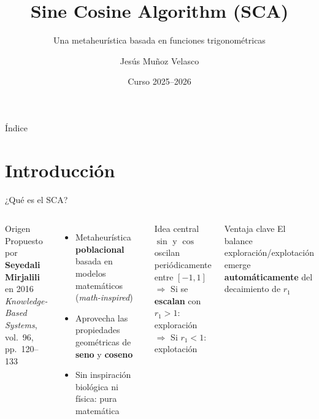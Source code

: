 \documentclass[aspectratio=169]{beamer}
\title[SCA]{Sine Cosine Algorithm (SCA)}
\subtitle{Una metaheurística basada en funciones trigonométricas}
\author{Jesús Muñoz Velasco}
\institute{Metaheurísticas · Trabajo Final}
\date{Curso 2025--2026}
\newcommand{\highlight}[1]{\textcolor{myblue}{\textbf{#1}}}
\begin{document}
\begin{frame}[plain]
  \titlepage
\end{frame}

\begin{frame}{Índice}
  \tableofcontents
\end{frame}

\section{Introducción}

\begin{frame}{¿Qué es el SCA?}
  \begin{columns}[T]
      \begin{block}{Origen}
        Propuesto por \textbf{Seyedali Mirjalili} en 2016\\
        \textit{Knowledge-Based Systems}, vol.~96, pp.~120--133
      \end{block}
      \vspace{0.4em}
      \begin{itemize}
        \item Metaheurística \highlight{poblacional} basada en modelos matemáticos (\textit{math-inspired})
        \item Aprovecha las propiedades geométricas de \highlight{seno} y \highlight{coseno}
        \item Sin inspiración biológica ni física: pura matemática
      \end{itemize}

      \begin{exampleblock}{Idea central}
        $\sin$ y $\cos$ oscilan periódicamente entre $[-1,1]$\\[0.4em]
        $\Rightarrow$ Si se \textbf{escalan} con $r_1 > 1$: exploración\\
        $\Rightarrow$ Si $r_1 < 1$: explotación
      \end{exampleblock}
      \vspace{0.4em}
      \begin{alertblock}{Ventaja clave}
        El balance exploración/explotación emerge \textbf{automáticamente} del decaimiento de $r_1$
      \end{alertblock}
  \end{columns}
\end{frame}
\end{document}
